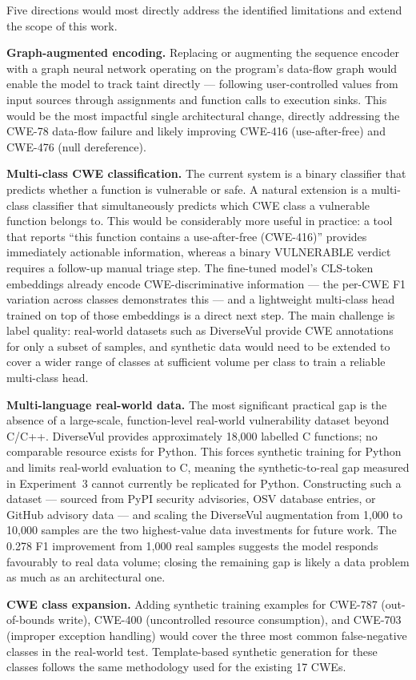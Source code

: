 Five directions would most directly address the identified limitations and extend the
scope of this work.

\textbf{Graph-augmented encoding.}
Replacing or augmenting the sequence encoder with a graph neural network operating on the
program's data-flow graph would enable the model to track taint directly --- following
user-controlled values from input sources through assignments and function calls to
execution sinks.
This would be the most impactful single architectural change, directly addressing the
CWE-78 data-flow failure and likely improving CWE-416 (use-after-free) and CWE-476
(null dereference).

\textbf{Multi-class CWE classification.}
The current system is a binary classifier that predicts whether a function is vulnerable
or safe.
A natural extension is a multi-class classifier that simultaneously predicts which CWE
class a vulnerable function belongs to.
This would be considerably more useful in practice: a tool that reports ``this function
contains a use-after-free (CWE-416)'' provides immediately actionable information,
whereas a binary VULNERABLE verdict requires a follow-up manual triage step.
The fine-tuned model's CLS-token embeddings already encode CWE-discriminative
information --- the per-CWE F1 variation across classes demonstrates this --- and a
lightweight multi-class head trained on top of those embeddings is a direct next step.
The main challenge is label quality: real-world datasets such as DiverseVul provide
CWE annotations for only a subset of samples, and synthetic data would need to be
extended to cover a wider range of classes at sufficient volume per class to train a
reliable multi-class head.

\textbf{Multi-language real-world data.}
The most significant practical gap is the absence of a large-scale, function-level
real-world vulnerability dataset beyond C/C++.
DiverseVul provides approximately 18{,}000 labelled C functions; no comparable resource
exists for Python.
This forces synthetic training for Python and limits real-world evaluation to C, meaning
the synthetic-to-real gap measured in Experiment~3 cannot currently be replicated for
Python.
Constructing such a dataset --- sourced from PyPI security advisories, OSV database
entries, or GitHub advisory data --- and scaling the DiverseVul augmentation from
1{,}000 to 10{,}000 samples are the two highest-value data investments for future work.
The 0.278 F1 improvement from 1{,}000 real samples suggests the model responds
favourably to real data volume; closing the remaining gap is likely a data problem
as much as an architectural one.

\textbf{CWE class expansion.}
Adding synthetic training examples for CWE-787 (out-of-bounds write), CWE-400 (uncontrolled
resource consumption), and CWE-703 (improper exception handling) would cover the three most
common false-negative classes in the real-world test.
Template-based synthetic generation for these classes follows the same methodology used
for the existing 17 CWEs.
